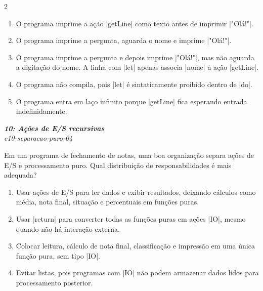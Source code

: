 \documentclass[a4paper,10pt,brazil]{article}
\begin{document}
\begin{multicols}{2}
\begin{enumerate}
  \item O programa imprime a ação \haskellinline|getLine| como texto antes de imprimir \haskellinline|"Olá!"|.

  \item O programa imprime a pergunta, aguarda o nome e imprime \haskellinline|"Olá!"|.

  \item O programa imprime a pergunta e depois imprime \haskellinline|"Olá!"|, mas não aguarda a digitação do nome. A linha com \haskellinline|let| apenas associa \haskellinline|nome| à ação \haskellinline|getLine|.

  \item O programa não compila, pois \haskellinline|let| é sintaticamente proibido dentro de \haskellinline|do|.

  \item O programa entra em laço infinito porque \haskellinline|getLine| fica esperando entrada indefinidamente.


\end{enumerate}

\begin{flushright}
  \footnotesize
  \textit{\textbf{10: Ações de E/S recursivas}}\\
  \textit{c10-separacao-puro-04}\\

\end{flushright}
Em um programa de fechamento de notas, uma boa organização separa ações de E/S e processamento puro. Qual distribuição de responsabilidades é mais adequada?

\begin{enumerate}
  \item Usar ações de E/S para ler dados e exibir resultados, deixando cálculos como média, nota final, situação e percentuais em funções puras.

  \item Usar \haskellinline|return| para converter todas as funções puras em ações \haskellinline|IO|, mesmo quando não há interação externa.

  \item Colocar leitura, cálculo de nota final, classificação e impressão em uma única função pura, sem tipo \haskellinline|IO|.

  \item Evitar listas, pois programas com \haskellinline|IO| não podem armazenar dados lidos para processamento posterior.


\end{enumerate}
\end{multicols}
\end{document}
